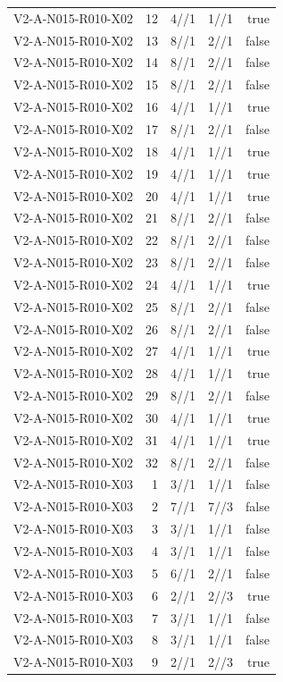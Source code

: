 {\begin{longtable}{lrrrr}
V2-A-N015-R010-X02 & 12 & 4//1 & 1//1 & true \\
V2-A-N015-R010-X02 & 13 & 8//1 & 2//1 & false \\
V2-A-N015-R010-X02 & 14 & 8//1 & 2//1 & false \\
V2-A-N015-R010-X02 & 15 & 8//1 & 2//1 & false \\
V2-A-N015-R010-X02 & 16 & 4//1 & 1//1 & true \\
V2-A-N015-R010-X02 & 17 & 8//1 & 2//1 & false \\
V2-A-N015-R010-X02 & 18 & 4//1 & 1//1 & true \\
V2-A-N015-R010-X02 & 19 & 4//1 & 1//1 & true \\
V2-A-N015-R010-X02 & 20 & 4//1 & 1//1 & true \\
V2-A-N015-R010-X02 & 21 & 8//1 & 2//1 & false \\
V2-A-N015-R010-X02 & 22 & 8//1 & 2//1 & false \\
V2-A-N015-R010-X02 & 23 & 8//1 & 2//1 & false \\
V2-A-N015-R010-X02 & 24 & 4//1 & 1//1 & true \\
V2-A-N015-R010-X02 & 25 & 8//1 & 2//1 & false \\
V2-A-N015-R010-X02 & 26 & 8//1 & 2//1 & false \\
V2-A-N015-R010-X02 & 27 & 4//1 & 1//1 & true \\
V2-A-N015-R010-X02 & 28 & 4//1 & 1//1 & true \\
V2-A-N015-R010-X02 & 29 & 8//1 & 2//1 & false \\
V2-A-N015-R010-X02 & 30 & 4//1 & 1//1 & true \\
V2-A-N015-R010-X02 & 31 & 4//1 & 1//1 & true \\
V2-A-N015-R010-X02 & 32 & 8//1 & 2//1 & false \\
V2-A-N015-R010-X03 & 1 & 3//1 & 1//1 & false \\
V2-A-N015-R010-X03 & 2 & 7//1 & 7//3 & false \\
V2-A-N015-R010-X03 & 3 & 3//1 & 1//1 & false \\
V2-A-N015-R010-X03 & 4 & 3//1 & 1//1 & false \\
V2-A-N015-R010-X03 & 5 & 6//1 & 2//1 & false \\
V2-A-N015-R010-X03 & 6 & 2//1 & 2//3 & true \\
V2-A-N015-R010-X03 & 7 & 3//1 & 1//1 & false \\
V2-A-N015-R010-X03 & 8 & 3//1 & 1//1 & false \\
V2-A-N015-R010-X03 & 9 & 2//1 & 2//3 & true \\

\end{longtable}}
